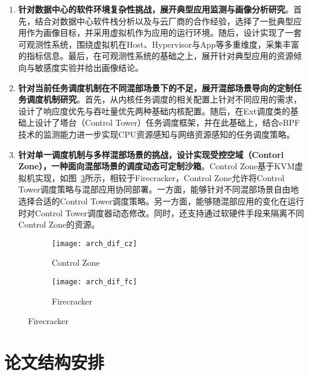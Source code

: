 \begin{enumerate}

    \item \textbf{针对数据中心的软件环境复杂性挑战，展开典型应用监测与画像分析研究}。首先，结合对数据中心软件栈分析以及与云厂商的合作经验，选择了一批典型应用作为画像目标，并采用虚拟机作为应用的运行环境。随后，设计实现了一套可观测性系统，围绕虚拟机在Host、Hypervisor与App等多重维度，采集丰富的指标信息。最后，在可观测性系统的基础之上，展开针对典型应用的资源倾向与敏感度实验并给出画像结论。

    \item \textbf{针对当前任务调度机制在不同混部场景下的不足，展开混部场景导向的定制任务调度机制研究}。首先，从内核任务调度的相关配置上针对不同应用的需求，设计了响应度优先与吞吐量优先两种基础内核配置。随后，在Ext调度类的基础上设计了塔台（Control Tower）任务调度框架，并在此基础上，结合eBPF技术的监测能力进一步实现CPU资源感知与网络资源感知的任务调度策略。

    \item \textbf{针对单一调度机制与多样混部场景的挑战，设计实现受控空域（Contorl Zone），一种面向混部场景的调度动态可定制沙箱}。Control Zone基于KVM虚拟机实现，如图~\ref{fig:arch_dif}所示，相较于Firecracker\citep{agache2020firecracker}，Control Zone允许将Control Tower调度策略与混部应用协同部署。一方面，能够针对不同混部场景自由地选择合适的Control Tower调度策略。另一方面，能够随混部应用的变化在运行时对Control Tower调度器动态修改。同时，还支持通过软硬件手段来隔离不同Control Zone的资源。

\end{enumerate}

\begin{figure}[!htbp]
    \centering
    \begin{subfigure}[b]{0.45\textwidth}
        \texttt{[image: arch\_dif\_cz]}
        \caption{Control Zone}
        \label{fig:arch_dif_cz}
    \end{subfigure}
    \hfill
    \begin{subfigure}[b]{0.45\textwidth}
        \texttt{[image: arch\_dif\_fc]}
        \caption{Firecracker}
        \label{fig:arch_dif_fc}
    \end{subfigure}
\label{fig:arch_dif}
\end{figure}

\section{论文结构安排}

